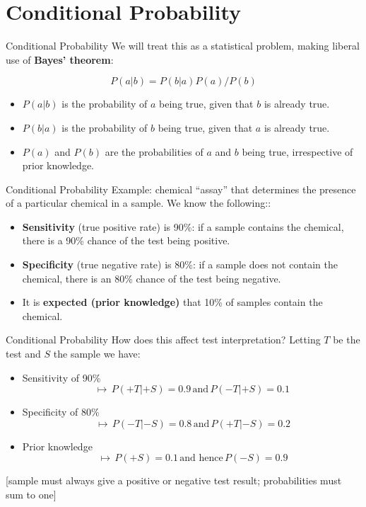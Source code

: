 \documentclass{beamer}
\begin{document}
\section{Conditional Probability}
\begin{frame}{Conditional Probability}
  We will treat this as a statistical problem, making liberal use of \textbf{Bayes' theorem}:

  \begin{equation*}
    P(a|b) = P(b|a)P(a)/P(b)
  \end{equation*}

  \begin{itemize}
    \item $P(a|b)$ is the probability of $a$ being true, given that $b$ is already true.
    \item $P(b|a)$ is the probability of $b$ being true, given that $a$ is already true.
    \item $P(a)$ and $P(b)$ are the probabilities of $a$ and $b$ being true, irrespective of prior knowledge.
  \end{itemize}
\end{frame}

\begin{frame}{Conditional Probability}
  Example: chemical ``assay'' that determines the presence of a particular chemical in a sample. We know the following::
  \begin{itemize}
    \item \textbf{Sensitivity} (true positive rate) is 90\%: if a sample contains the chemical, there is a 90\% chance of the test being positive.
    \item \textbf{Specificity} (true negative rate) is 80\%: if a sample does not contain the chemical, there is an 80\% chance of the test being negative.
    \item It is \textbf{expected (prior knowledge)} that 10\% of samples contain the chemical.
  \end{itemize}
\end{frame}

\begin{frame}{Conditional Probability}
  How does this affect test interpretation? Letting $T$ be the test and $S$ the sample we have:
  \begin{itemize}
    \item Sensitivity of 90\%
      \begin{equation*}
        \mapsto\, P(+T|+S) = 0.9\, \mbox{and}\, P(-T|+S)=0.1
      \end{equation*}
    \item Specificity of 80\%
      \begin{equation*}
        \, \mapsto\, P(-T|-S) = 0.8\, \mbox{and}\, P(+T|-S)=0.2
      \end{equation*}
    \item Prior knowledge
      \begin{equation*}
        \, \mapsto\, P(+S) = 0.1\, \mbox{and hence}\, P(-S)=0.9
      \end{equation*}
  \end{itemize}
  [sample must always give a positive or negative test result; probabilities must sum to one]
\end{frame}
\end{document}
